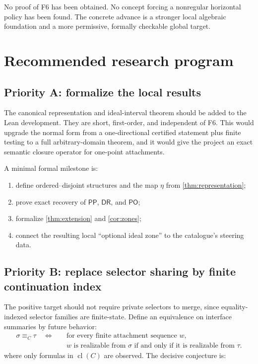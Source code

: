 \documentclass[11pt]{article}
\theoremstyle{definition}
\theoremstyle{remark}
\newcommand{\PP}{\mathsf{PP}}
\newcommand{\PO}{\mathsf{PO}}
\newcommand{\DR}{\mathsf{DR}}
\newcommand{\cl}{\operatorname{cl}}
\begin{document}
No proof of F6 has been obtained.  No concept forcing a nonregular horizontal policy has been found.  The concrete advance is a stronger local algebraic foundation and a more permissive, formally checkable global target.

\section{Recommended research program}

\subsection{Priority A: formalize the local results}

The canonical representation and ideal-interval theorem should be added to the Lean development.  They are short, first-order, and independent of F6.  This would upgrade the normal form from a one-directional certified statement plus finite testing to a full arbitrary-domain theorem, and it would give the project an exact semantic closure operator for one-point attachments.

A minimal formal milestone is:
\begin{enumerate}[label=A\arabic*.,leftmargin=3em]
\item define ordered--disjoint structures and the map $\eta$ from \cref{thm:representation};
\item prove exact recovery of $\PP$, $\DR$, and $\PO$;
\item formalize \cref{thm:extension} and \cref{cor:zones};
\item connect the resulting local ``optional ideal zone'' to the catalogue's steering data.
\end{enumerate}

\subsection{Priority B: replace selector sharing by finite continuation index}

The positive target should not require private selectors to merge, since equality-indexed selector families are finite-state.  Define an equivalence on interface summaries by future behavior:
\[
\begin{aligned}
  \sigma\equiv_C\tau
  \quad\Longleftrightarrow\quad &
  \text{for every finite attachment sequence $w$,}\\
  &\text{$w$ is realizable from $\sigma$ if and only if it is realizable from $\tau$.}
\end{aligned}
\]
where only formulas in $\cl(C)$ are observed.  The decisive conjecture is:
\end{document}
